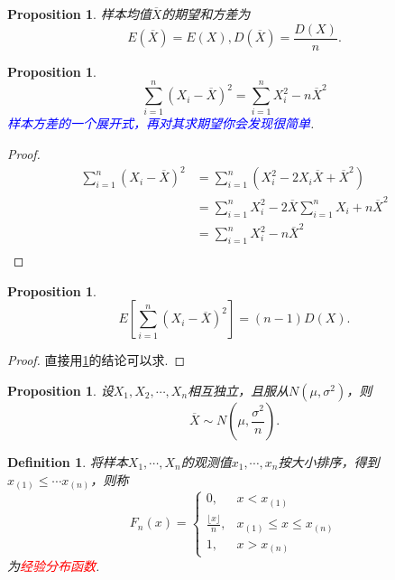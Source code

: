 \documentclass{article}
\newtheorem{proposition}[theorem]{Proposition}
\newtheorem{definition}[theorem]{Definition}
\newcommand{\redt}[1]{\textcolor{red}{#1}}
\newcommand{\bluet}[1]{\textcolor{blue}{#1}}
\begin{document}
\begin{proposition}
\rm 样本均值$\overline{X}$的期望和方差为 
$$
E(\overline{X}) = E(X), D(\overline{X})=\frac{D(X)}{n}.
$$
\end{proposition}

\begin{proposition}\label{sample-variance-expand}
\rm 
$$
\sum\limits_{i = 1}^n (X_i - \overline{X})^2 = \sum\limits_{i = 1}^n X_i^2 -  n\overline{X}^2 
$$
\bluet{样本方差的一个展开式，再对其求期望你会发现很简单}. 
\end{proposition}

\begin{proof}
$$
\begin{array}{ll}
\sum\limits_{i = 1}^n (X_i - \overline{X})^2 &= \sum\limits_{i = 1}^n (X_i^2 - 2X_i\overline{X} + \overline{X}^2)  \\
&=  \sum\limits_{i = 1}^n X_i^2 - 2\overline{X} \sum\limits_{i = 1}^n X_i + n\overline{X}^2 \\
&= \sum\limits_{i = 1}^n X_i^2  - n\overline{X}^2\\
\end{array}
$$
\end{proof}

\begin{proposition}
\rm 
$$
E\left[ \sum\limits_{i = 1}^n  (X_i - \overline{X})^2 \right] = (n-1)D(X).
$$
\end{proposition}

\begin{proof}
\rm 直接用\ref{sample-variance-expand}的结论可以求. 
\end{proof}

\begin{proposition}\label{sample-mean-distribution}
\rm 设$X_1,X_2,\cdots,X_n$相互独立，且服从$N(\mu,\sigma^2)$，则
$$
\overline{X} \sim N(\mu,\frac{\sigma^2}{n}).
$$
\end{proposition}

\begin{definition}
\rm 将样本$X_1,\cdots,X_n$的观测值$x_1,\cdots,x_n$按大小排序，得到$x_{(1)} \leq \cdots x_{(n)}$，则称
$$
F_n(x) = \left\{
\begin{array}{ll}
0, & x <x_{(1)} \\
\frac{\lfloor x \rfloor}{n}, &  x_{(1)}\leq x \leq x_{(n)}\\
1, &x > x_{(n)}
\end{array} \right.
$$
为\redt{经验分布函数}.
\end{definition}
\end{document}

